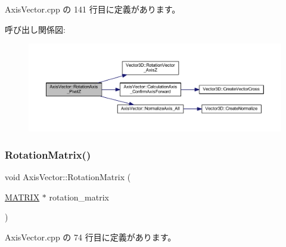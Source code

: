  Axis\+Vector.\+cpp の 141 行目に定義があります。

呼び出し関係図\+:
\nopagebreak
\begin{figure}[H]
\begin{center}
\leavevmode
\includegraphics[width=350pt]{class_axis_vector_adde5b636a046a4fe6c5c943646045843_cgraph}
\end{center}
\end{figure}
\mbox{\label{class_axis_vector_a33aab769ff2de997393c13414fa23873}} 
\subsubsection{\texorpdfstring{Rotation\+Matrix()}{RotationMatrix()}}
{\footnotesize\ttfamily void Axis\+Vector\+::\+Rotation\+Matrix (\begin{DoxyParamCaption}\item[{\mbox{\hyperlink{_vector3_d_8h_a032295cd9fb1b711757c90667278e744}{M\+A\+T\+R\+IX}} $\ast$}]{rotation\+\_\+matrix }\end{DoxyParamCaption})}



 Axis\+Vector.\+cpp の 74 行目に定義があります。

